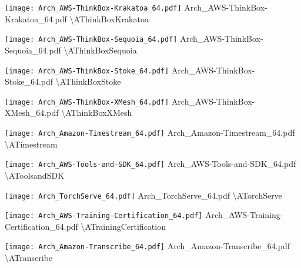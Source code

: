 {\texttt{[image: Arch\_AWS-ThinkBox-Krakatoa\_64.pdf]}} {Arch\_AWS-ThinkBox-Krakatoa\_64.pdf} {{\textbackslash}AThinkBoxKrakatoa}

 {\texttt{[image: Arch\_AWS-ThinkBox-Sequoia\_64.pdf]}} {Arch\_AWS-ThinkBox-Sequoia\_64.pdf} {{\textbackslash}AThinkBoxSequoia}

 {\texttt{[image: Arch\_AWS-ThinkBox-Stoke\_64.pdf]}} {Arch\_AWS-ThinkBox-Stoke\_64.pdf} {{\textbackslash}AThinkBoxStoke}

 {\texttt{[image: Arch\_AWS-ThinkBox-XMesh\_64.pdf]}} {Arch\_AWS-ThinkBox-XMesh\_64.pdf} {{\textbackslash}AThinkBoxXMesh}

 {\texttt{[image: Arch\_Amazon-Timestream\_64.pdf]}} {Arch\_Amazon-Timestream\_64.pdf} {{\textbackslash}ATimestream}

 {\texttt{[image: Arch\_AWS-Tools-and-SDK\_64.pdf]}} {Arch\_AWS-Tools-and-SDK\_64.pdf} {{\textbackslash}AToolsandSDK}

 {\texttt{[image: Arch\_TorchServe\_64.pdf]}} {Arch\_TorchServe\_64.pdf} {{\textbackslash}ATorchServe}

 {\texttt{[image: Arch\_AWS-Training-Certification\_64.pdf]}} {Arch\_AWS-Training-Certification\_64.pdf} {{\textbackslash}ATrainingCertification}

 {\texttt{[image: Arch\_Amazon-Transcribe\_64.pdf]}} {Arch\_Amazon-Transcribe\_64.pdf} {{\textbackslash}ATranscribe}

